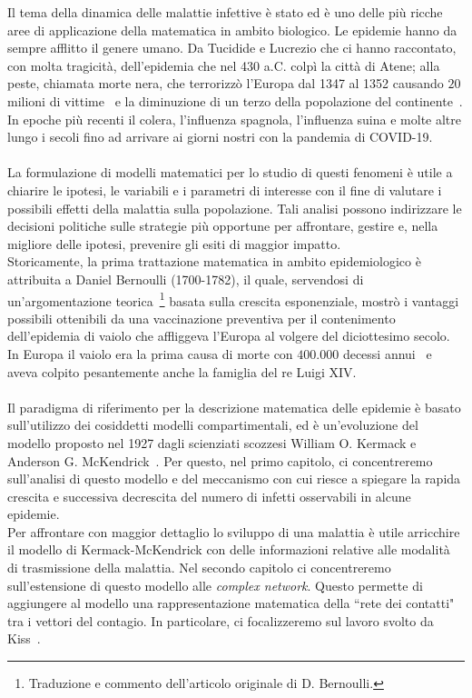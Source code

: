 \documentclass[12pt,a4paper,twoside]{report}
\begin{document}
Il tema della dinamica delle malattie infettive \`e stato ed \`e uno delle pi\`u ricche aree di applicazione della matematica in ambito biologico.  Le epidemie hanno  da sempre afflitto il genere umano.  Da Tucidide e Lucrezio che ci hanno raccontato,  con molta tragicit\`a,  dell'epidemia che nel 430 a.C.  colp\`i la citt\`a di Atene; alla  peste,  chiamata morte nera,   che terrorizz\`o l'Europa dal 1347 al 1352 causando $20$ milioni di vittime~\cite{ujvari2020storia} e  la diminuzione di  un terzo della popolazione del continente~\cite{alchon2003pest}.  In epoche pi\`u recenti il colera,  l'influenza spagnola,  l'influenza suina e molte altre lungo i  secoli fino ad arrivare ai giorni nostri con la pandemia di COVID-19.\\ \\
La formulazione di modelli matematici per lo  studio di questi fenomeni \`e utile a chiarire le ipotesi, le variabili e i parametri di interesse con il fine di valutare i possibili effetti della malattia sulla popolazione. Tali analisi possono indirizzare le decisioni politiche sulle strategie pi\`u opportune per affrontare, gestire e, nella migliore delle ipotesi, prevenire gli esiti di maggior impatto.\\ Storicamente,  la prima trattazione matematica in ambito   epidemiologico \`e attribuita  a Daniel Bernoulli (1700-1782), il quale, servendosi di un'argomentazione teorica~\cite{Bernoulli}\footnote{Traduzione e commento dell'articolo originale di D. Bernoulli.} basata sulla crescita esponenziale,  mostr\`o i  vantaggi possibili ottenibili da una vaccinazione preventiva per il contenimento dell'epidemia di vaiolo che affliggeva l'Europa al volgere del diciottesimo secolo. In Europa il vaiolo era la prima causa di morte con $400.000$ decessi annui~\cite{VAIOLO} e aveva colpito pesantemente anche la famiglia del re Luigi XIV.\\ \\
Il paradigma di riferimento per la descrizione matematica delle epidemie \`e basato sull'utilizzo dei cosiddetti modelli compartimentali, ed \`e un'evoluzione del modello proposto nel 1927 dagli scienziati scozzesi William O. Kermack e Anderson G. McKendrick~\cite{kermack}.  Per questo, nel primo capitolo, ci concentreremo sull'analisi di questo modello e del meccanismo con cui riesce a spiegare la rapida crescita e successiva decrescita del numero di infetti osservabili in alcune epidemie.\\ 
Per affrontare con maggior dettaglio lo sviluppo di una malattia \`e utile arricchire il modello di Kermack-McKendrick con delle informazioni relative alle modalit\`a di trasmissione della malattia. Nel secondo capitolo ci concentreremo sull'estensione di questo modello alle \textit{complex network}. Questo permette di aggiungere al modello una rappresentazione matematica della  ``rete dei contatti" tra i vettori del contagio. In particolare, ci focalizzeremo sul lavoro svolto da Kiss~\cite{KISS}.\\
\end{document}
